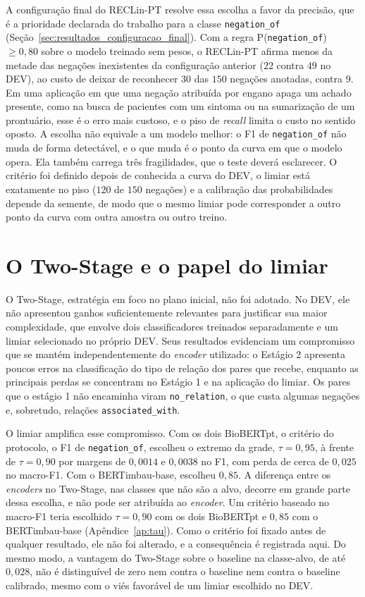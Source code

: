 A configuração final do RECLin-PT resolve essa escolha a favor da precisão, que é a
prioridade declarada do trabalho para a classe \texttt{negation\_of}
(Seção~\ref{sec:resultados_configuracao_final}). Com a regra
P(\texttt{negation\_of})~$\geq 0{,}80$ sobre o modelo treinado sem pesos, o
RECLin-PT afirma menos da metade das negações inexistentes da configuração anterior
($22$ contra $49$ no DEV), ao custo de deixar de reconhecer $30$ das $150$ negações
anotadas, contra $9$. Em uma aplicação em que uma negação atribuída por engano
apaga um achado presente, como na busca de pacientes com um sintoma ou na
sumarização de um prontuário, esse é o erro mais custoso, e o piso de \emph{recall}
limita o custo no sentido oposto. A escolha não equivale a um modelo melhor: o F1
de \texttt{negation\_of} não muda de forma detectável, e o que muda é o ponto da
curva em que o modelo opera. Ela também carrega três fragilidades, que o teste
deverá esclarecer. O critério foi definido depois de conhecida a curva do DEV, o
limiar está exatamente no piso ($120$ de $150$ negações) e a calibração das
probabilidades depende da semente, de modo que o mesmo limiar pode corresponder a
outro ponto da curva com outra amostra ou outro treino.

\section{O Two-Stage e o papel do limiar}
\label{sec:discussao_twostage}

O Two-Stage, estratégia em foco no plano inicial, não foi adotado. No DEV, ele não apresentou ganhos suficientemente relevantes para justificar sua maior complexidade, que envolve dois classificadores treinados separadamente e um limiar selecionado no próprio DEV. Seus resultados evidenciam um compromisso que se mantém independentemente do \emph{encoder} utilizado: o Estágio 2 apresenta poucos erros na classificação do tipo de relação dos pares que recebe, enquanto as principais perdas se concentram no Estágio 1 e na aplicação do limiar. Os pares que o estágio 1 não encaminha viram
\texttt{no\_relation}, o que custa algumas negações e, sobretudo, relações
\texttt{associated\_with}.

O limiar amplifica esse compromisso. Com os dois BioBERTpt, o critério do protocolo,
o F1 de \texttt{negation\_of}, escolheu o extremo da grade, $\tau=0{,}95$, à frente de
$\tau=0{,}90$ por margens de $0{,}0014$ e $0{,}0038$ no F1, com perda de cerca de
$0{,}025$ no macro-F1. Com o BERTimbau-base, escolheu $0{,}85$. A diferença entre os
\emph{encoders} no Two-Stage, nas classes que não são a alvo, decorre em grande parte
dessa escolha, e não pode ser atribuída ao \emph{encoder}. Um critério baseado no
macro-F1 teria escolhido $\tau=0{,}90$ com os dois BioBERTpt e $0{,}85$ com o
BERTimbau-base (Apêndice~\ref{ap:tau}). Como o critério foi fixado antes de qualquer
resultado, ele não foi alterado, e a consequência é registrada aqui. Do mesmo modo, a
vantagem do Two-Stage sobre o baseline na classe-alvo, de até $0{,}028$, não é
distinguível de zero nem contra o baseline nem contra o baseline calibrado, mesmo
com o viés favorável de um limiar escolhido no DEV.

